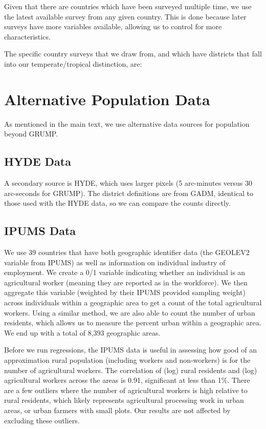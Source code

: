 \documentclass[11pt]{article}
\begin{document}
Given that there are countries which have been surveyed multiple time, we use the latest available survey from any given country. This is done because later surveys have more variables available, allowing us to control for more characteristics.

The specific country surveys that we draw from, and which have districts that fall into our temperate/tropical distinction, are:
 

\section{Alternative Population Data}
As mentioned in the main text, we use alternative data sources for population beyond GRUMP.

\subsection{HYDE Data}
A secondary source is HYDE, which uses larger pixels (5 arc-minutes versus 30 arc-seconds for GRUMP). The district definitions are from GADM, identical to those used with the HYDE data, so we can compare the counts directly.

\subsection{IPUMS Data}
We use 39 countries that have both geographic identifier data (the GEOLEV2 variable from IPUMS) as well as information on individual industry of employment. We create a 0/1 variable indicating whether an individual is an agricultural worker (meaning they are reported as in the workforce). We then aggregate this variable (weighted by their IPUMS provided sampling weight) across individuals within a geographic area to get a count of the total agricultural workers. Using a similar method, we are also able to count the number of urban residents, which allows us to measure the percent urban within a geographic area. We end up with a total of 8,393 geographic areas.

Before we run regressions, the IPUMS data is useful in assessing how good of an approximation rural population (including workers and non-workers) is for the number of agricultural workers. The correlation of (log) rural residents and (log) agricultural workers across the areas is 0.91, significant at less than 1\%. There are a few outliers where the number of agricultural workers is high relative to rural residents, which likely represents agricultural processing work in urban areas, or urban farmers with small plots. Our results are not affected by excluding these outliers.
\end{document}

